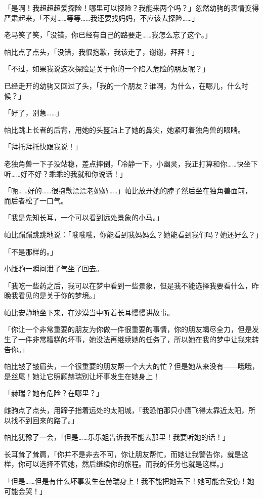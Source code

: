 「是啊！我超超超爱探险！哪里可以探险？我能来两个吗？」忽然幼驹的表情变得严肃起来，「不对……等等……我还要找妈妈，不应该去探险……」

老马笑了笑，「没错，你已经有自己的路要走……我怎么忘了这个。」

帕比点了点头，「没错，我很抱歉，我该走了，谢谢，拜拜！」

「不过，如果我说这次探险是关于你的一个陷入危险的朋友呢？」

已经走开的幼驹又回过了头，「我的一个朋友？谁啊，为什么，在哪儿，什么时候？」

「好了，别急……」

帕比跳上长者的后背，用她的头盔贴上了她的鼻尖，她紧盯着独角兽的眼睛。

「拜托拜托快跟我说！」

老独角兽一下子没站稳，差点摔倒，「冷静一下，小幽灵，我正打算和你……快坐下听……好不好？乖乖的我就和你说话！」

「呃……好的……很抱歉漂漂老奶奶……」帕比放开她的脖子然后坐在独角兽面前，而后者松了一口气。

「我是先知长耳，一个可以看到远处景象的小马。」

帕比蹦蹦跳跳地说：「哦哦哦，你能看到我妈妈么？她能看到我们吗？她还好么？」

「不是那样的。」

小雌驹一瞬间泄了气坐了回去。

「我吃一些药之后，我可以在梦中看到一些景象，但是我不能选择我要看什么，昨晚我看见的是关于你的梦境。」

帕比安静地坐下来，在沙漠当中听着长耳慢慢讲故事。

「你让一个非常重要的朋友为你做一件很重要的事情，你的朋友竭尽全力，但是发生了一件非常糟糕的坏事，她没法再继续她的任务了，所以她在我的梦中让我来转告你。」

帕比皱了皱眉头，一个很重要的朋友帮一个大大的忙？但是她从来没有——哦哦，是丝尾！她让它照顾赫瑞别让坏事发生在她身上！

「赫瑞？她有危险？在哪里？」

雌驹点了点头，用蹄子指着远处的太阳城，「我恐怕那只小鹰飞得太靠近太阳，所以找不到回来的路了。」

帕比犹豫了一会，「但是……乐乐姐告诉我不能去那里！我要听她的话！」

长耳耸了耸肩，「你并不是非去不可，你让朋友帮忙，而她让我警告你，就是这样，你可以选择不管她，然后继续你的旅程。而我的任务也就是这样。」

「但是……但是有什么坏事发生在赫瑞身上！我不能把她丢下！她可能会受伤！她可能会哭！」

